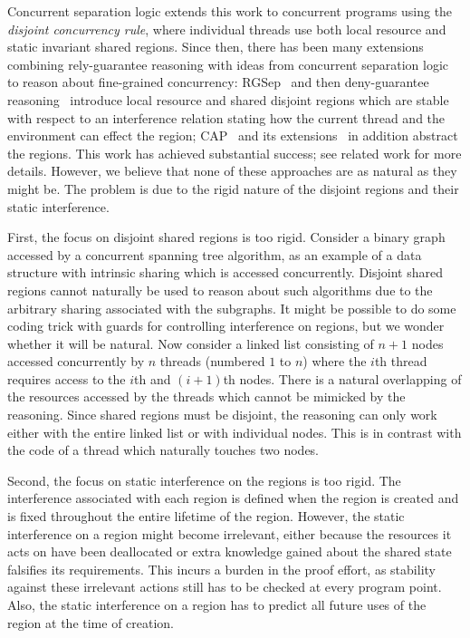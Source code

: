 Concurrent separation logic extends this work to concurrent programs
using the {\em disjoint concurrency rule}, where individual threads
use both local resource and static invariant shared regions. Since
then, there has been many extensions combining rely-guarantee
reasoning with ideas from concurrent separation logic to reason about
fine-grained concurrency: RGSep~\cite{viktor-marriage} and then
deny-guarantee reasoning~\cite{dg} introduce local resource and shared
disjoint regions which are stable with respect to an interference
relation stating how the current thread and the environment can effect
the region; CAP~\cite{cap-ecoop10} and its
extensions~\cite{hocap,icap,tada} in addition abstract the
regions. This work has achieved substantial success; see related work
for more details. However, we believe that none of these approaches
are as natural as they might be.  The problem is due to the rigid
nature of the disjoint regions and their static interference.


First, the focus on  disjoint shared regions is too rigid.
Consider a binary graph accessed by a concurrent spanning tree
algorithm, as an example of a data structure with intrinsic sharing
which is accessed concurrently. Disjoint shared regions cannot
naturally be used to reason about such algorithms due to the arbitrary
sharing associated with the subgraphs. It might be possible to do some
coding trick with guards for controlling interference on regions, but we wonder whether it will be
natural. Now consider a linked list consisting of $n+1$ nodes accessed
concurrently by $n$ threads (numbered $1$ to $n$) where the $i$th
thread requires access to the $i$th and $(i+1)$th nodes.  There is a
natural overlapping of the resources accessed by the threads which
cannot be mimicked by the reasoning. Since shared regions must be
disjoint, the reasoning can only work either with the entire linked
list or with individual nodes. This is in contrast with the code of a
thread which naturally touches two nodes.



Second, the focus on static interference on the regions is too rigid. 
The interference associated with each region is defined when
the region  is created and is fixed throughout the entire lifetime of
the region. However, the static interference  on a region might 
become irrelevant, either because the resources it acts on have been
deallocated or extra knowledge gained about the shared state
falsifies its requirements.  This incurs
a burden in the proof effort, as stability against these irrelevant
actions still has to be checked at every program point.
Also, the static interference on  a region has to predict all future 
uses of the region at the time of creation. 

